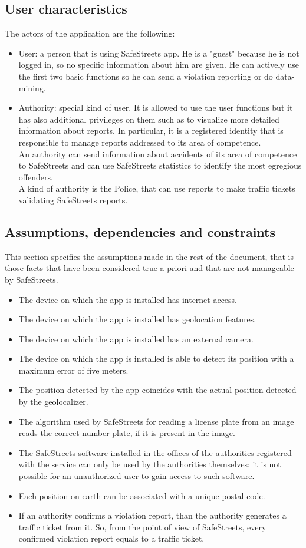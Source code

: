 \documentclass{article}
\newcommand\assumption[1]{\item[{[A#1]}] }
\begin{document}
		\subsection{User characteristics}
			The actors of the application are the following:
			\begin{itemize}
				\item User: a person that is using SafeStreets app. He is a "guest" because he is not logged in, so no specific information about him are given. He can actively use the first two basic functions so he can send a violation reporting or do data-mining.
				\item Authority: special kind of user. It is allowed to use the user functions but it has also additional privileges on them such as to visualize more detailed information about reports. In particular, it is a registered identity that is responsible to manage reports addressed to its area of competence.\\
				An authority can send information about accidents of its area of competence to SafeStreets and can use SafeStreets statistics to identify the most egregious offenders.\\
		        A kind of authority is the Police, that can use reports to make traffic tickets validating SafeStreets reports.
			\end{itemize}
		
		\subsection{Assumptions, dependencies and constraints}	\label{assumptions}
			This section specifies the assumptions made in the rest of the document, that is those facts that have been considered true a priori and that are not manageable by SafeStreets.
			\begin{itemize}
				\assumption{1} The device on which the app is installed has internet access.
				\assumption{2} The device on which the app is installed has geolocation features.
				\assumption{3} The device on which the app is installed has an external camera.
				\assumption{4} The device on which the app is installed is able to detect its position with a maximum error of five meters.
				\assumption{5} The position detected by the app coincides with the actual position detected by the geolocalizer.
				\assumption{6} The algorithm used by SafeStreets for reading a license plate from an image reads the correct number plate, if it is present in the image.
				\assumption{7} The SafeStreets software installed in the offices of the authorities registered with the service can only be used by the authorities themselves: it is not possible for an unauthorized user to gain access to such software.
				\assumption{8} Each position on earth can be associated with a unique postal code.
				\assumption{9} If an authority confirms a violation report, than the authority generates a traffic ticket from it. So, from the point of view of SafeStreets, every confirmed violation report equals to a traffic ticket.
				
			\end{itemize}
	
\end{document}
